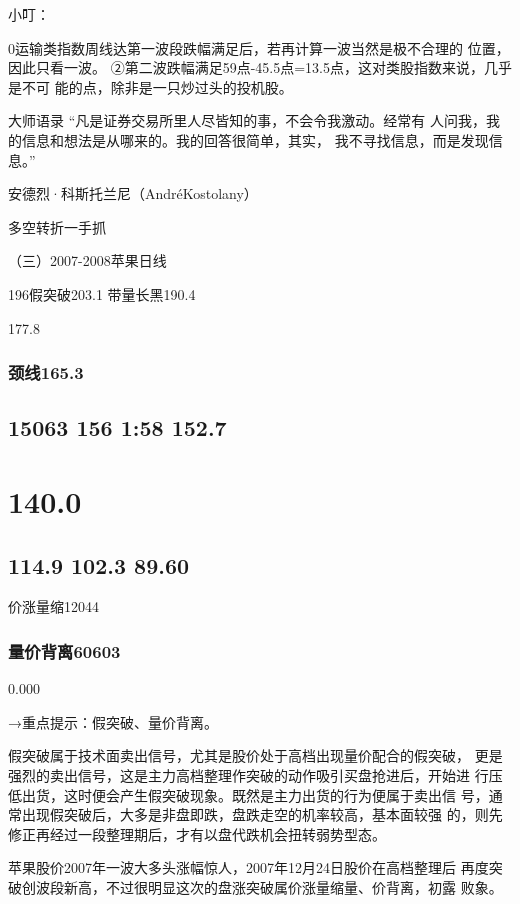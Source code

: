 \documentclass{article}
\begin{document}
小叮：

0运输类指数周线达第一波段跌幅满足后，若再计算一波当然是极不合理的 位置，因此只看一波。 ②第二波跌幅满足59点-45.5点=13.5点，这对类股指数来说，几乎是不可 能的点，除非是一只炒过头的投机股。

大师语录 “凡是证券交易所里人尽皆知的事，不会令我激动。经常有 人问我，我的信息和想法是从哪来的。我的回答很简单，其实， 我不寻找信息，而是发现信息。”

安德烈·科斯托兰尼（AndréKostolany）

\clearpage

多空转折一手抓

（三）2007-2008苹果日线

196假突破203.1 带量长黑190.4

177.8

\subsubsection{颈线165.3}

\subsection{15063 156 1:58 152.7}

\section{140.0}

\subsection{114.9 102.3 89.60}

价涨量缩12044

\subsubsection{量价背离60603}

0.000

→重点提示：假突破、量价背离。

假突破属于技术面卖出信号，尤其是股价处于高档出现量价配合的假突破， 更是强烈的卖出信号，这是主力高档整理作突破的动作吸引买盘抢进后，开始进 行压低出货，这时便会产生假突破现象。既然是主力出货的行为便属于卖出信 号，通常出现假突破后，大多是非盘即跌，盘跌走空的机率较高，基本面较强 的，则先修正再经过一段整理期后，才有以盘代跌机会扭转弱势型态。

苹果股价2007年一波大多头涨幅惊人，2007年12月24日股价在高档整理后 再度突破创波段新高，不过很明显这次的盘涨突破属价涨量缩量、价背离，初露 败象。
\end{document}
